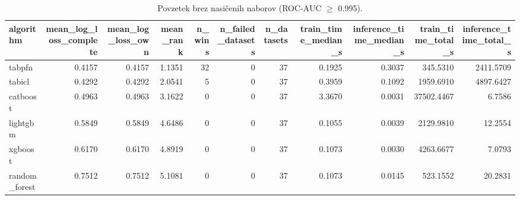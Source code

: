\begin{table}[htbp]
\centering
\caption{Povzetek brez nasičenih naborov (ROC-AUC $\geq$ 0.995).}
\label{tab:overall-nonsat}
\begin{tabular}{lrrrrrrrrrr}
\hline
algorithm & mean\_log\_loss\_complete & mean\_log\_loss\_own & mean\_rank & n\_wins & n\_failed\_datasets & n\_datasets & train\_time\_median\_s & inference\_time\_median\_s & train\_time\_total\_s & inference\_time\_total\_s \\
\hline
tabpfn & 0.4157 & 0.4157 & 1.1351 & 32 & 0 & 37 & 0.1925 & 0.3037 & 345.5310 & 2411.5709 \\
tabicl & 0.4292 & 0.4292 & 2.0541 & 5 & 0 & 37 & 0.3959 & 0.1092 & 1959.6910 & 4897.6427 \\
catboost & 0.4963 & 0.4963 & 3.1622 & 0 & 0 & 37 & 3.3670 & 0.0031 & 37502.4467 & 6.7586 \\
lightgbm & 0.5849 & 0.5849 & 4.6486 & 0 & 0 & 37 & 0.1055 & 0.0039 & 2129.9810 & 12.2554 \\
xgboost & 0.6170 & 0.6170 & 4.8919 & 0 & 0 & 37 & 0.1073 & 0.0030 & 4263.6677 & 7.0793 \\
random\_forest & 0.7512 & 0.7512 & 5.1081 & 0 & 0 & 37 & 0.1073 & 0.0145 & 523.1552 & 20.2831 \\
\hline
\end{tabular}
\end{table}
